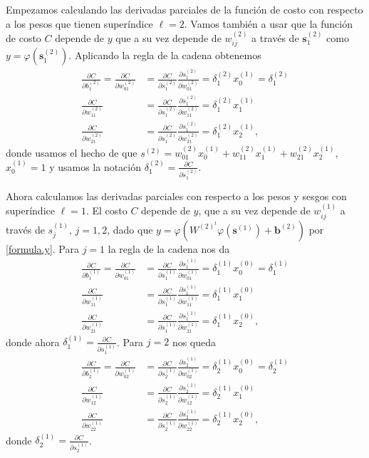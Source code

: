 \documentclass[12pt, a4paper]{amsbook}
\newcommand{\sbf}{{\mathbf s}}
\newcommand{\bb}{{\mathbf b}}
\theoremstyle{remark}
\theoremstyle{definition}
\numberwithin{section}{chapter}
\numberwithin{subsection}{section}
\numberwithin{equation}{section}
\numberwithin{figure}{chapter}
\begin{document}
Empezamos calculando las derivadas parciales de la función de costo con respecto a los pesos que tienen superíndice $\ell=2$. Vamos también a usar que la función de costo $C$ depende de $y$ que a su vez depende de $w_{ij}^{(2)}$ a través de $\sbf_1^{(2)}$ como $y=\varphi(\sbf_1^{(2)})$. Aplicando la regla de la cadena obtenemos
\begin{align*}
\frac{\partial C}{\partial b_1^{(2)}} = \frac{\partial C}{\partial w_{01}^{(2)}} &= \frac{\partial C}{\partial s_1^{(2)}} \frac{\partial s_1^{(2)}}{\partial w_{01}^{(2)}} = \delta_1^{(2)} x_0^{(1)} = \delta_1^{(2)}\\
\frac{\partial C}{\partial w_{11}^{(2)}} &= \frac{\partial C}{\partial s_1^{(2)}} \frac{\partial s_1^{(2)}}{\partial w_{11}^{(2)}} = \delta_1^{(2)} x_1^{(1)}\\
\frac{\partial C}{\partial w_{21}^{(2)}} &= \frac{\partial C}{\partial s_1^{(2)}} \frac{\partial s_1^{(2)}}{\partial w_{21}^{(2)}} = \delta_1^{(2)} x_2^{(1)},
\end{align*}
donde usamos el hecho de que $s^{(2)} = w_{01}^{(2)} x_0^{(1)} + w_{11}^{(2)} x_1^{(1)} + w_{21}^{(2)} x_2^{(1)}$, $x_0^{(1)}=1$ y usamos la notación $\delta_1^{(2)} = \frac{\partial C}{\partial s_1^{(2)}}$.

Ahora calculamos las derivadas parciales con respecto a los pesos y sesgos con superíndice $\ell=1$. El costo $C$ depende de $y$, que a su vez depende de $w_{ij}^{(1)}$ a través de $s_j^{(1)}$, $j=1,2$, dado que $y=\varphi(W^{(2)^t}\varphi(\sbf^{(1)}) + \bb^{(2)})$ por \eqref{formula.y}. Para $j=1$ la regla de la cadena nos da
\begin{align*}
\frac{\partial C}{\partial b_1^{(1)}} = \frac{\partial C}{\partial w_{01}^{(1)}} &= \frac{\partial C}{\partial s_1^{(1)}} \frac{\partial s_1^{(1)}}{\partial w_{01}^{(1)}} = \delta_1^{(1)} x_0^{(0)} = \delta_1^{(1)}\\
\frac{\partial C}{\partial w_{11}^{(1)}} &= \frac{\partial C}{\partial s_1^{(1)}} \frac{\partial s_1^{(1)}}{\partial w_{11}^{(1)}} = \delta_1^{(1)} x_1^{(0)}\\
\frac{\partial C}{\partial w_{21}^{(1)}} &= \frac{\partial C}{\partial s_1^{(1)}} \frac{\partial s_1^{(1)}}{\partial w_{21}^{(1)}} = \delta_1^{(1)} x_2^{(0)},
\end{align*}
donde ahora $\delta_1^{(1)} = \frac{\partial C}{\partial s_1^{(1)}}$. Para $j=2$ nos queda
\begin{align*}
\frac{\partial C}{\partial b_2^{(1)}} = \frac{\partial C}{\partial w_{02}^{(1)}} &= \frac{\partial C}{\partial s_2^{(1)}} \frac{\partial s_2^{(1)}}{\partial w_{02}^{(1)}} = \delta_2^{(1)} x_0^{(0)} = \delta_2^{(1)}\\
\frac{\partial C}{\partial w_{12}^{(1)}} &= \frac{\partial C}{\partial s_2^{(1)}} \frac{\partial s_2^{(1)}}{\partial w_{12}^{(1)}} = \delta_2^{(1)} x_1^{(0)}\\
\frac{\partial C}{\partial w_{22}^{(1)}} &= \frac{\partial C}{\partial s_2^{(1)}} \frac{\partial s_2^{(1)}}{\partial w_{22}^{(1)}} = \delta_2^{(1)} x_2^{(0)},
\end{align*}
donde $\delta_2^{(1)} = \frac{\partial C}{\partial s_2^{(1)}}$.
\end{document}
